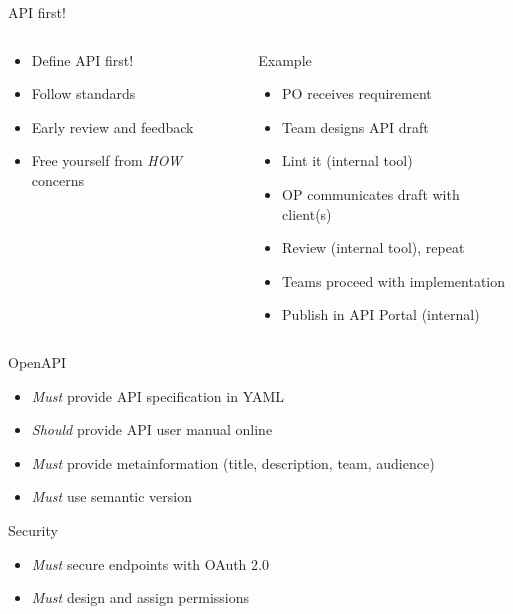 \documentclass[10pt]{beamer}
\begin{document}
\begin{frame}{API first!}
  \begin{columns}
   	\begin{column}{0.4\textwidth}
	  \begin{itemize}
	    \item Define API first!
		\item Follow standards
		\item Early review and feedback
		\item Free yourself from \emph{HOW} concerns
	  \end{itemize}
   	\end{column}

    \begin{column}{0.6\textwidth}
      Example
      \begin{itemize}
        \item PO receives requirement
        \item Team designs API draft
        \item Lint it (internal tool)
        \item OP communicates draft with client(s)
        \item Review (internal tool), repeat
        \item Teams proceed with implementation
        \item Publish in API Portal (internal)
     	\end{itemize}
   \end{column}
  \end{columns}

\end{frame}

\begin{frame}{OpenAPI}
  \begin{itemize}
    \item \emph{Must} provide API specification in YAML
    \item \emph{Should} provide API user manual online
    \item \emph{Must} provide metainformation (title, description, team, audience)
    \item \emph{Must} use semantic version
  \end{itemize}
\end{frame}

\begin{frame}{Security}
  \begin{itemize}
    \item \emph{Must} secure endpoints with OAuth 2.0
    \item \emph{Must} design and assign permissions
  \end{itemize}
\end{frame}
\end{document}
